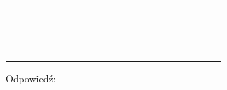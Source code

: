 \documentclass[10pt]{article}
\begin{document}
\begin{center}
\begin{tabular}{|c|c|c|c|c|c|c|c|c|c|c|c|c|c|c|c|c|c|c|c|c|c|}
\hline
 &  &  &  &  &  &  &  &  &  &  &  &  &  &  &  &  &  &  &  &  &  \\
\hline
 &  &  &  &  &  &  &  &  &  &  &  &  &  &  &  &  &  &  &  &  &  \\
\hline
 &  &  &  &  &  &  &  &  &  &  &  &  &  &  &  &  &  &  &  &  &  \\
\hline
 &  &  &  &  &  &  &  &  &  &  &  &  &  &  &  &  &  &  &  &  &  \\
\hline
 &  &  &  &  &  &  &  &  &  &  &  &  &  &  &  &  &  &  &  &  &  \\
\hline
 &  &  &  &  &  &  &  &  &  &  &  &  &  &  &  &  &  &  &  &  &  \\
\hline
 &  &  &  &  &  &  &  &  &  &  &  &  &  &  &  &  &  &  &  &  &  \\
\hline
 &  &  &  &  &  &  &  &  &  &  &  &  &  &  &  &  &  &  &  &  &  \\
\hline
 &  &  &  &  &  &  &  &  &  &  &  &  &  &  &  &  &  &  &  &  &  \\
\hline
 &  &  &  &  &  &  &  &  &  &  &  &  &  &  &  &  &  &  &  &  &  \\
\hline
 &  &  &  &  &  &  &  &  &  &  &  &  &  &  &  &  &  &  &  &  &  \\
\hline
 &  &  &  &  &  &  &  &  &  &  &  &  &  &  &  &  &  &  &  &  &  \\
\hline
 &  &  &  &  &  &  &  &  &  &  &  &  &  &  &  &  &  &  &  &  &  \\
\hline
 &  &  &  &  &  &  &  &  &  &  &  &  &  &  &  &  &  &  &  &  &  \\
\hline
 &  &  &  &  &  &  &  &  &  &  &  &  &  &  &  &  &  &  &  &  &  \\
\hline
 &  &  &  &  &  &  &  &  &  &  &  &  &  &  &  &  &  &  &  &  &  \\
\hline
\end{tabular}
\end{center}

Odpowiedź:
\end{document}
